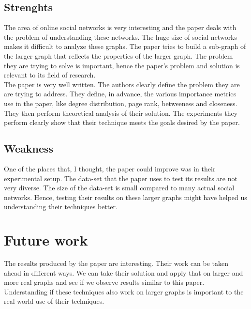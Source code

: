 \documentclass[12pt, onecolumn]{IEEEtran}
\begin{document}
\subsection{Strenghts}
The area of online social networks is very interesting and the paper deals with
the problem of understanding these networks. The huge size of social networks
makes it difficult to analyze these graphs. The paper tries to build a sub-graph
of the larger graph that reflects the properties of the larger graph. The
problem they are trying to solve is important, hence the paper's problem and
solution is relevant to its field of research.
\\
The paper is very well written. The authors clearly define the problem they are
are trying to address. They define, in advance, the various importance metrics
use in the paper, like degree distribution, page rank, betweeness and
closeness. They then perform theoretical analysis of their solution. The
experiments they perform clearly show that their technique meets the goals
desired by the paper.
\\
\subsection{Weakness}
One of the places that, I thought, the paper could improve was in their
experimental setup. The data-set that the paper uses to test its results are not
very diverse. The size of the data-set is small compared to many actual social
networks. Hence, testing their results on these larger graphs might have helped
us understanding their techniques better.

\section{Future work}
The results produced by the paper are interesting. Their work can be taken
ahead in different ways. We can take their solution and apply that on larger
and more real graphs and see if we observe results similar to this paper.
Understanding if these techniques also work on larger graphs is important to
the real world use of their techniques. 
\\


 
\end{document}
